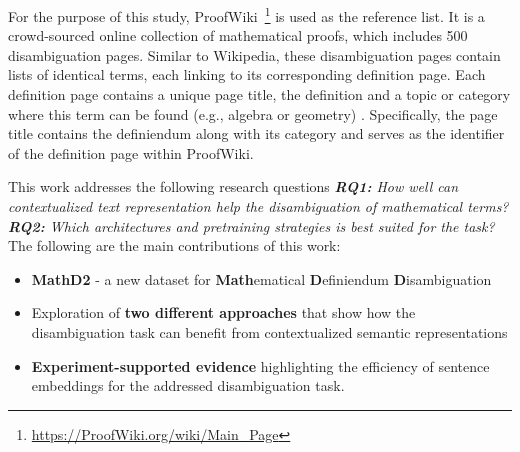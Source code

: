 
For the purpose of this study, ProofWiki~\footnote{\url{https://ProofWiki.org/wiki/Main_Page}} is used as the reference list. It is a crowd-sourced online collection of mathematical proofs, which includes 500 disambiguation pages. 
Similar to Wikipedia, these disambiguation pages contain lists of identical terms, each linking to its corresponding definition page. Each definition page contains a unique page title, the definition %
and a topic or category where this term can be found (e.g., algebra or geometry)%
. Specifically, the page title contains the definiendum along with its category and serves as the identifier of the definition page within ProofWiki.

This work 
addresses the following research questions \textit{\textbf{RQ1:} How well can contextualized text representation help the disambiguation of mathematical terms? \textbf{RQ2:} Which architectures and pretraining strategies is best suited for the task?} The following are the main contributions of this work: %
\begin{itemize}
    \item \textbf{MathD2} - a new dataset for \textbf{Math}ematical \textbf{D}efiniendum \textbf{D}isambiguation
    \item Exploration of \textbf{two different approaches} that show how the disambiguation task can benefit from contextualized semantic representations 
    \item \textbf{Experiment-supported evidence} %
    highlighting the efficiency of sentence embeddings for the addressed disambiguation task.
\end{itemize}
